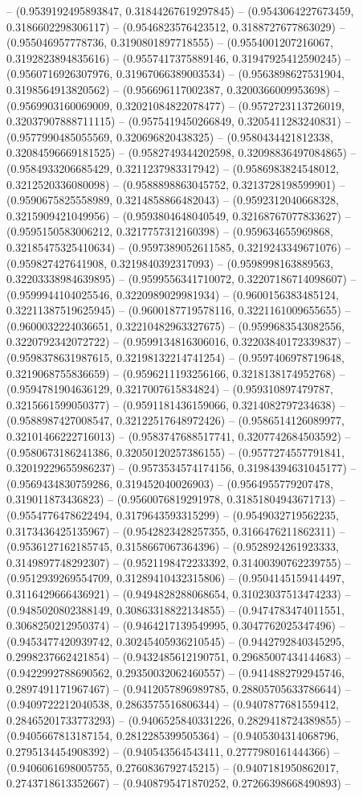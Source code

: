 -- (0.9539192495893847, 0.31844267619297845) -- (0.9543064227673459, 0.3186602298306117) -- (0.9546823576423512, 0.3188727677863029) -- (0.955046957778736, 0.3190801897718555) -- (0.9554001207216067, 0.3192823894835616) -- (0.9557417375889146, 0.31947925412590245) -- (0.9560716926307976, 0.31967066389003534) -- (0.9563898627531904, 0.3198564913820562) -- (0.956696117002387, 0.3200366009953698) -- (0.9569903160069009, 0.32021084822078477) -- (0.9572723113726019, 0.32037907888711115) -- (0.9575419450266849, 0.3205411283240831) -- (0.9577990485055569, 0.320696820438325) -- (0.9580434421812338, 0.32084596669181525) -- (0.9582749344202598, 0.32098836497084865) -- (0.9584933206685429, 0.3211237983317942) -- (0.9586983824548012, 0.3212520336080098) -- (0.9588898863045752, 0.3213728198599901) -- (0.9590675825558989, 0.3214858866482043) -- (0.9592312040668328, 0.3215909421049956) -- (0.9593804648040549, 0.32168767077833627) -- (0.9595150583006212, 0.3217757312160398) -- (0.959634655969868, 0.32185475325410634) -- (0.9597389052611585, 0.3219243349671076) -- (0.959827427641908, 0.3219840392317093) -- (0.9598998163889563, 0.32203338984639895) -- (0.9599556341710072, 0.32207186714098607) -- (0.9599944104025546, 0.3220989029981934) -- (0.9600156383485124, 0.32211387519625945) -- (0.9600187719578116, 0.3221161009655655) -- (0.9600032224036651, 0.32210482963327675) -- (0.9599683543082556, 0.3220792342072722) -- (0.9599134816306016, 0.32203840172339837) -- (0.9598378631987615, 0.32198132214741254) -- (0.9597406978719648, 0.3219068755836659) -- (0.9596211193256166, 0.3218138174952768) -- (0.9594781904636129, 0.3217007615834824) -- (0.959310897479787, 0.3215661599050377) -- (0.9591181436159066, 0.3214082797234638) -- (0.9588987427008547, 0.32122517648972426) -- (0.9586514126089977, 0.32101466222716013) -- (0.9583747688517741, 0.3207742684503592) -- (0.9580673186241386, 0.32050120257386155) -- (0.9577274557791841, 0.32019229655986237) -- (0.9573534574174156, 0.31984394631045177) -- (0.9569434830759286, 0.319452040026903) -- (0.9564955779207478, 0.319011873436823) -- (0.9560076819291978, 0.31851804943671713) -- (0.9554776478622494, 0.3179643593315299) -- (0.9549032719562235, 0.3173436425135967) -- (0.9542823428257355, 0.3166476211862311) -- (0.9536127162185745, 0.3158667067364396) -- (0.9528924261923333, 0.3149897748292307) -- (0.9521198472233392, 0.31400390762239755) -- (0.9512939269554709, 0.31289410432315806) -- (0.9504145159414497, 0.3116429666436921) -- (0.9494828288068654, 0.31023037513474233) -- (0.9485020802388149, 0.30863318822134855) -- (0.9474783474011551, 0.3068250212950374) -- (0.9464217139549995, 0.3047762025347496) -- (0.9453477420939742, 0.30245405936210545) -- (0.9442792840345295, 0.2998237662421854) -- (0.9432485612190751, 0.29685007434144683) -- (0.9422992788690562, 0.29350032062460557) -- (0.9414882792945746, 0.2897491171967467) -- (0.9412057896989785, 0.28805705633786644) -- (0.9409722212040538, 0.2863575516806344) -- (0.9407877681559412, 0.28465201733773293) -- (0.9406525840331226, 0.2829418724389855) -- (0.9405667813187154, 0.2812285399505364) -- (0.9405304314068796, 0.2795134454908392) -- (0.940543564543411, 0.2777980161444366) -- (0.9406061698005755, 0.2760836792745215) -- (0.9407181950862017, 0.2743718613352667) -- (0.9408795471870252, 0.27266398668490893) -- 